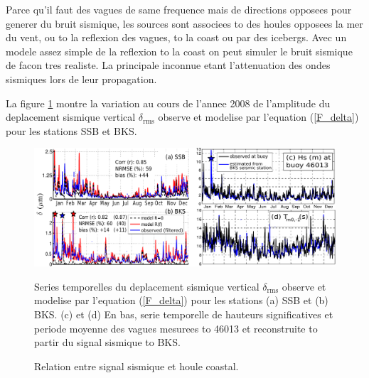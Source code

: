 Parce qu'il faut des vagues de same frequence mais de directions opposees pour generer du bruit sismique, les sources sont associees to des houles opposees 
la mer du vent, ou to la reflexion des vagues, to la coast ou par des icebergs. 
Avec un modele assez simple de la reflexion to la coast on peut simuler le bruit sismique de facon tres realiste. La principale inconnue etant 
l'attenuation des ondes sismiques lors de leur propagation. 

La figure \ref{fig:sismo_timeseries} montre la variation au cours de l'annee 2008 de l'amplitude du deplacement sismique vertical $\delta_{\mathrm{rms}}$
observe et modelise par l'equation (\ref{F_delta}) pour les stations SSB et BKS. 


\begin{figure}
\centerline{\includegraphics[width=\textwidth]{FIGS_CH_SISMO/timeseries_2008_BKS_SSB_only.pdf}}
  \caption{Relation entre signal sismique et houle coastal.}{Series temporelles du deplacement sismique vertical $\delta_{\mathrm{rms}}$
observe et modelise par l'equation (\ref{F_delta}) pour les stations (a) SSB et (b) BKS. 
(c) et (d) En bas, serie temporelle de hauteurs significatives et periode moyenne des vagues mesurees to 46013 et reconstruite to partir du signal sismique to BKS. 
}
\label{fig:sismo_timeseries}
\end{figure}



